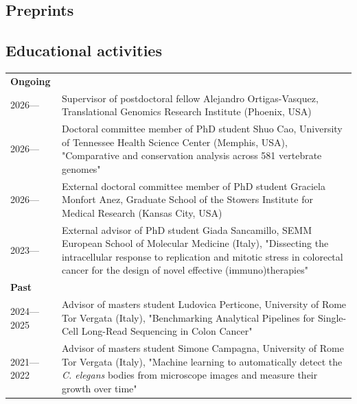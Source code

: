 \documentclass[oneside,11pt,a4paper,nologo]{book}
\begin{document}
\subsection*{Preprints}




\subsection*{Educational activities}

\begin{tabular}{p{2cm}p{12.3cm}}  %
  \textbf{Ongoing} & \\


  2026--- & Supervisor of postdoctoral fellow Alejandro Ortigas-Vasquez, Translational Genomics Research Institute (Phoenix, USA) \\

  2026--- & Doctoral committee member of PhD student Shuo Cao, University of Tennessee Health Science Center (Memphis, USA), "Comparative and conservation analysis across 581 vertebrate genomes" \\

  2026--- & External doctoral committee member of PhD student Graciela Monfort Anez, Graduate School of the Stowers Institute for Medical Research (Kansas City, USA) \\

  2023--- & External advisor of PhD student Giada Sancamillo, SEMM European School of Molecular Medicine (Italy), "Dissecting the intracellular response to replication and mitotic stress in colorectal cancer for the design of novel effective (immuno)therapies" \\

  \textbf{Past} & \\
  2024---2025 & Advisor of masters student Ludovica Perticone, University of Rome Tor Vergata (Italy), "Benchmarking Analytical Pipelines for Single-Cell Long-Read Sequencing in Colon Cancer" \\

  2021---2022 & Advisor of masters student Simone Campagna, University of Rome Tor Vergata (Italy), "Machine learning to automatically detect the \textit{C. elegans} bodies from microscope images and measure their growth over time" \\


\end{tabular}
\end{document}
